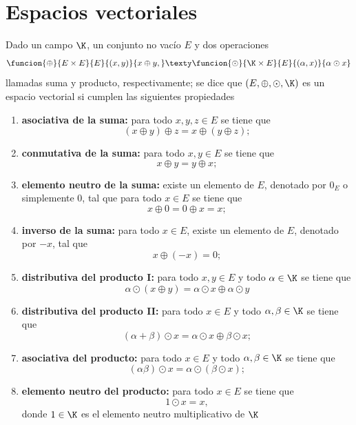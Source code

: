 \documentclass[a4,11pt]{aleph-notas}
\begin{document}
\encabezado


\section{Espacios vectoriales}

\begin{defi}
    Dado un campo $\K$, un conjunto no vacío $E$ y dos operaciones
    \[
        \funcion{\oplus}{E\times E}{E}{(x,y)}{x\oplus y,}
        \texty
        \funcion{\odot}{\K\times E}{E}{(\alpha,x)}{\alpha\odot x}
    \]
    llamadas suma y producto, respectivamente; se dice que $(E,\oplus,\odot,\K)$ es un espacio vectorial si cumplen las siguientes propiedades
    \begin{enumerate}
    \item \textbf{asociativa de la suma:}
        para todo $x,y,z\in E$ se tiene que
        \[
            (x \oplus y) \oplus z = x \oplus (y \oplus z);
        \]
    \item \textbf{conmutativa de la suma:}
        para todo $x,y\in E$ se tiene que
        \[
            x \oplus y = y \oplus x;
        \]
    \item \textbf{elemento neutro de la suma:}
        existe un elemento de $E$, denotado por $0_E$ o simplemente $0$, tal que para todo $x\in E$ se tiene que 
        \[
            x \oplus 0 = 0 \oplus x = x;
        \]
    \item \textbf{inverso de la suma:}
        para todo $x\in E$, existe un elemento de $E$, denotado por $-x$, tal que
        \[
            x \oplus (-x)= 0;
        \]
    \item \textbf{distributiva del producto I:}
        para todo $x,y\in E$ y todo $\alpha\in \K$ se tiene que
        \[
            \alpha\odot (x \oplus y)=\alpha\odot x \oplus \alpha\odot y
        \]
    \item \textbf{distributiva del producto II:}
        para todo $x\in E$ y todo $\alpha,\beta\in \K$ se tiene que
        \[
            (\alpha+\beta)\odot x=\alpha\odot x \oplus \beta\odot x;
        \]
    \item \textbf{asociativa del producto:}
        para todo $x\in E$ y todo $\alpha,\beta\in \K$ se tiene que
        \[
            (\alpha\beta)\odot x=\alpha\odot(\beta\odot x);
        \]
    \item \textbf{elemento neutro del producto:}
        para todo $x\in E$ se tiene que
        \[
            1\odot x=x,
        \]
        donde $1\in\K$ es el elemento neutro multiplicativo de $\K$
    \end{enumerate}
\end{defi}
\end{document}
